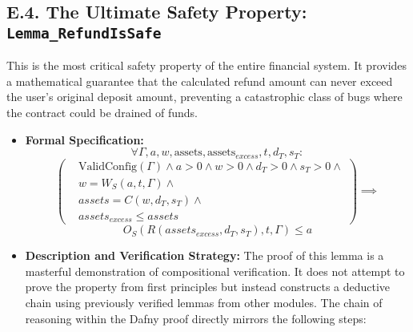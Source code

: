 \documentclass[
  english,
  onecolumn]{article}
\begin{document}
\subsection{\texorpdfstring{E.4. The Ultimate Safety Property:
\texttt{Lemma\_RefundIsSafe}}{E.4. The Ultimate Safety Property: Lemma\_RefundIsSafe}}\label{e.4.-the-ultimate-safety-property-lemma_refundissafe}

This is the most critical safety property of the entire financial
system. It provides a mathematical guarantee that the calculated refund
amount can never exceed the user's original deposit amount, preventing a
catastrophic class of bugs where the contract could be drained of funds.

\begin{itemize}
\item
  \textbf{Formal Specification:} \[
  \forall \Gamma, a, w, \text{assets}, \text{assets}_{excess}, t, d_T, s_T :
  \] \[
  (
  \begin{alignedat}{1}
  & \text{ValidConfig}(\Gamma) \land a > 0 \land w > 0 \land d_T > 0 \land s_T > 0 \land \\
  & w = W_S(a, t, \Gamma) \land \\
  & assets = C(w, d_T, s_T) \land \\
  & assets_{excess} \le assets
  \end{alignedat}
  ) \implies
  \] \[
  O_S(R(assets_{excess}, d_T, s_T), t, \Gamma) \le a
  \]
\item
  \textbf{Description and Verification Strategy:} The proof of this
  lemma is a masterful demonstration of compositional verification. It
  does not attempt to prove the property from first principles but
  instead constructs a deductive chain using previously verified lemmas
  from other modules. The chain of reasoning within the Dafny proof
  directly mirrors the following steps:


\end{itemize}
\end{document}
